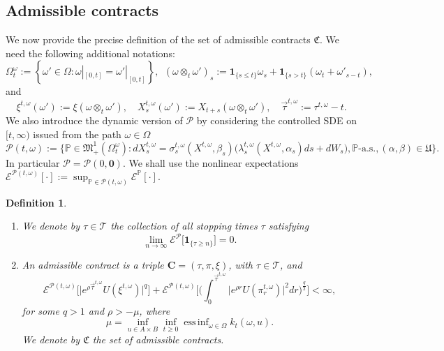 \documentclass[11pt,a4paper]{article}
\numberwithin{equation}{section}
\def\dbP{\mathbb{P}}
\newcommand{\cE}{\mathcal{E}}
\newcommand{\cP}{\mathcal{P}}
\newcommand{\cT}{\mathcal{T}}
\newcommand{\Cbf}{\mathbf{C}}
\newcommand{\frakC}{\mathfrak{C}}
\def\om{\omega}
\newcommand{\Ind}{\mathbf{1}}
\DeclareMathOperator*{\essinf}{ess\,inf}
\newtheorem{definition}[theorem]{Definition}
\theoremstyle{definition}
\begin{document}
\subsection{Admissible contracts}
\label{sect:admissiblecontracts}

We now provide the precise definition of the set of admissible contracts $\frakC$.
We need the following additional notations: 
  $$ \Omega_t^\omega:= \left\{\omega'\in\Omega : \omega|_{[0,t]} = \omega'|_{[0,t]}\right\},
  ~~
  (\om\otimes_t\om')_s:= \Ind_{\{s\le t\}}\om_s+\Ind_{\{s>t\}}(\om_t+\om'_{s-t}), 
  $$
  and 
  $$ \xi^{t,\om}(\om'):=\xi(\om\otimes_t\om'),\quad X^{t,\om}_s(\om'):=X_{t+s}(\om\otimes_t\om'),\quad \vec{\tau}^{t,\om}:=\tau^{t,\om}-t. 
  $$
We also introduce the dynamic version of $\cP$ by considering the controlled SDE on $[t,\infty)$ issued from the path $\omega\in\Omega$
  $$ 
  \cP(t,\omega)
  :=
  \Big\{\dbP\in \mathfrak{M}_+^1(\Omega_t^\omega): dX^{t,\omega}_s = \sigma^{t,\omega}_s(X^{t,\omega},\beta_s)\big(\lambda^{t,\omega}_s(X^{t,\omega},\alpha_s)ds + dW_s\big), \dbP\mbox{-a.s.}, (\alpha,\beta)\in\mathfrak{U} \Big\}. 
  $$
In particular $\cP=\cP(0,\mathbf{0})$. We shall use the nonlinear expectations $ \cE^{\cP(t,\omega)}[\cdot] := \sup_{\dbP\in\cP(t,\omega)}\cE^{\dbP}[\cdot].$



\begin{definition} \label{assum:xi.pi}
 \begin{enumerate}[{\rm (i)}]
  \item We denote by $\tau\in\cT$ the collection of all stopping times $\tau$ satisfying 
          \begin{equation} \label{eq:tau}
             \lim_{n\to\infty}\cE^{\cP}\big[\Ind_{\{\tau\geq n\}}\big]=0. 
          \end{equation}
  \item An admissible contract is a triple $\Cbf=(\tau,\pi,\xi)$, with $\tau\in\cT$, and
   \begin{equation} \label{contract-growth}
      \cE^{\cP(t,\omega)}\big[\big|e^{\rho\vec{\tau}^{t,\omega}}U(\xi^{t,\omega})\big|^q\big] + \cE^{\cP(t,\omega)}\bigg[\bigg(\int_0^{\vec{\tau}^{t,\omega}} \big|e^{\rho r}U(\pi_r^{t,\omega})\big|^2 dr\bigg)^{\frac{q}{2}}\bigg]<\infty,
   \end{equation} 
      for some $q>1$ and $\rho>-\mu$, where 
          $$ \mu = \inf_{u\in A\times B}\inf_{t\geq 0}\essinf_{\omega\in\Omega}k_t(\omega,u). $$
     We denote by $\frakC$ the set of admissible contracts. 
 \end{enumerate}
\end{definition}
\end{document}
